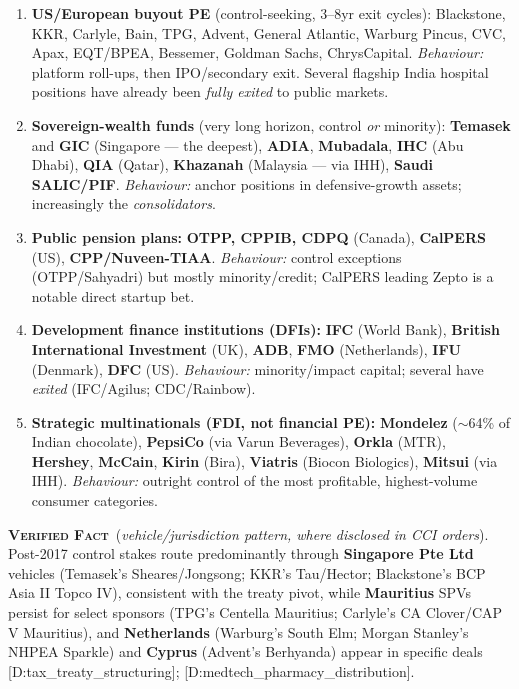 \documentclass[11pt,a4paper]{article}
\newcommand{\VF}{\textcolor{vfcol}{\textsc{\textbf{Verified Fact}}}}
\newcommand{\cs}[1]{\textnormal{[#1]}}
\begin{document}
\begin{enumerate}[leftmargin=1.6em,itemsep=3pt]
\item \textbf{US/European buyout PE} (control-seeking, 3--8yr exit cycles): Blackstone, KKR, Carlyle, Bain, TPG, Advent, General Atlantic, Warburg Pincus, CVC, Apax, EQT/BPEA, Bessemer, Goldman Sachs, ChrysCapital. \emph{Behaviour:} platform roll-ups, then IPO/secondary exit. Several flagship India hospital positions have already been \emph{fully exited} to public markets.
\item \textbf{Sovereign-wealth funds} (very long horizon, control \emph{or} minority): \textbf{Temasek} and \textbf{GIC} (Singapore --- the deepest), \textbf{ADIA}, \textbf{Mubadala}, \textbf{IHC} (Abu Dhabi), \textbf{QIA} (Qatar), \textbf{Khazanah} (Malaysia --- via IHH), \textbf{Saudi SALIC/PIF}. \emph{Behaviour:} anchor positions in defensive-growth assets; increasingly the \emph{consolidators}.
\item \textbf{Public pension plans:} \textbf{OTPP, CPPIB, CDPQ} (Canada), \textbf{CalPERS} (US), \textbf{CPP/Nuveen-TIAA}. \emph{Behaviour:} control exceptions (OTPP/Sahyadri) but mostly minority/credit; CalPERS leading Zepto is a notable direct startup bet.
\item \textbf{Development finance institutions (DFIs):} \textbf{IFC} (World Bank), \textbf{British International Investment} (UK), \textbf{ADB}, \textbf{FMO} (Netherlands), \textbf{IFU} (Denmark), \textbf{DFC} (US). \emph{Behaviour:} minority/impact capital; several have \emph{exited} (IFC/Agilus; CDC/Rainbow).
\item \textbf{Strategic multinationals (FDI, not financial PE):} \textbf{Mondelez} ($\sim$64\% of Indian chocolate), \textbf{PepsiCo} (via Varun Beverages), \textbf{Orkla} (MTR), \textbf{Hershey}, \textbf{McCain}, \textbf{Kirin} (Bira), \textbf{Viatris} (Biocon Biologics), \textbf{Mitsui} (via IHH). \emph{Behaviour:} outright control of the most profitable, highest-volume consumer categories.
\end{enumerate}

\VF\ (\emph{vehicle/jurisdiction pattern, where disclosed in CCI orders}). Post-2017 control stakes route predominantly through \textbf{Singapore Pte Ltd} vehicles (Temasek's Sheares/Jongsong; KKR's Tau/Hector; Blackstone's BCP Asia II Topco IV), consistent with the treaty pivot, while \textbf{Mauritius} SPVs persist for select sponsors (TPG's Centella Mauritius; Carlyle's CA Clover/CAP V Mauritius), and \textbf{Netherlands} (Warburg's South Elm; Morgan Stanley's NHPEA Sparkle) and \textbf{Cyprus} (Advent's Berhyanda) appear in specific deals \cs{D:tax\_treaty\_structuring}; \cs{D:medtech\_pharmacy\_distribution}.
\end{document}
